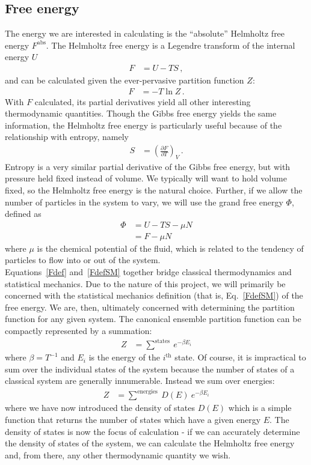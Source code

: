 \documentclass[12pt]{article}
\begin{document}
\subsection{Free energy}
The energy we are interested in calculating is the ``absolute'' Helmholtz free energy $F^{\text{abs}}$. The Helmholtz free energy is a Legendre transform of the internal energy $U$
\begin{align}
    F &= U - TS\, ,
    \label{Fdef}
\end{align}
and can be calculated given the ever-pervasive partition function $Z$:
\begin{align}
    F &= -T \ln Z\, .
    \label{FdefSM}
\end{align}
With $F$ calculated, its partial derivatives yield all other interesting thermodynamic quantities. Though the Gibbs free energy yields the same information, the Helmholtz free energy is particularly useful because of the relationship with entropy, namely
\begin{align}
    S &= \left(\frac{\partial F}{\partial T}\right)_{V}\, .
\end{align}
Entropy is a very similar partial derivative of the Gibbs free energy, but with pressure held fixed instead of volume. We typically will want to hold volume fixed, so the Helmholtz free energy is the natural choice. Further, if we allow the number of particles in the system to vary, we will use the grand free energy $\Phi$, defined as
\begin{align}
    \Phi &= U-TS-\mu N\\
    &= F - \mu N
    \label{Phidef}
\end{align}
where $\mu$ is the chemical potential of the fluid, which is related to the tendency of particles to flow into or out of the system.\\

Equations~\ref{Fdef} and~\ref{FdefSM} together bridge classical thermodynamics and statistical mechanics. Due to the nature of this project, we will primarily be concerned with the statistical mechanics definition (that is, Eq.~\ref{FdefSM}) of the free energy. We are, then, ultimately concerned with determining the partition function for any given system. The canonical ensemble partition function can be compactly represented by a summation:
\begin{align}
    Z &= \sum^{\text{states}}~e^{-\beta E_i}
\end{align}
where $\beta =  T^{-1}$ and $E_i$ is the energy of the $i^{\text{th}}$ state. Of course, it is impractical to sum over the individual states of the system because the number of states of a classical system are generally innumerable. Instead we sum over energies:
\begin{align}
    Z &= \sum^{\text{energies}}~D(E)~e^{-\beta E_i}
\end{align}
where we have now introduced the density of states $D(E)$ which is a simple function that returns the number of states which have a given energy $E$. The density of states is now the focus of calculation - if we can accurately determine the density of states of the system, we can calculate the Helmholtz free energy and, from there, any other thermodynamic quantity we wish. \\  
\end{document}

